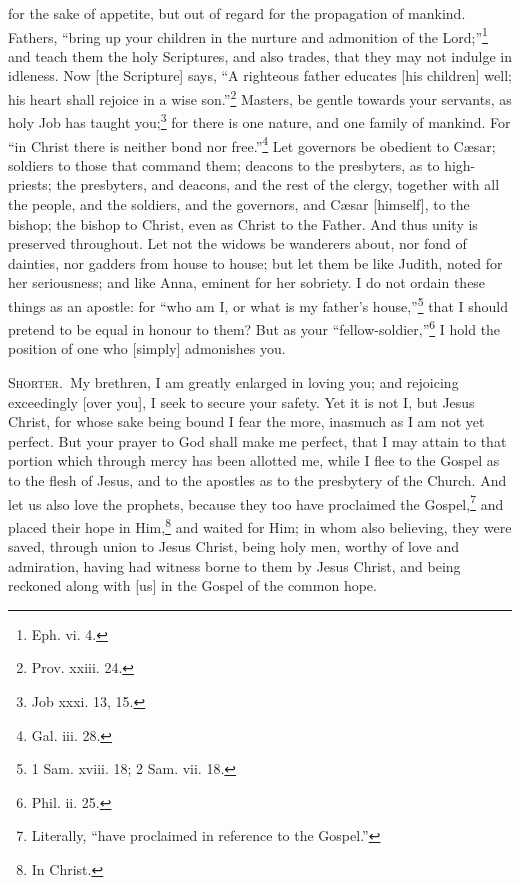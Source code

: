 for the sake of appetite, but out of regard for the propagation of mankind. Fathers, “bring up your children in the nurture and admonition of the Lord;”\footnote{Eph. vi. 4.} and teach them the holy Scriptures, and also trades, that they may not indulge in idleness. Now [the Scripture] says, “A righteous father educates [his children] well; his heart shall rejoice in a wise son.”\footnote{Prov. xxiii. 24.} Masters, be gentle towards your servants, as holy Job has taught you;\footnote{Job xxxi. 13, 15.} for there is one nature, and one family of mankind. For “in Christ there is neither bond nor free.”\footnote{Gal. iii. 28.} Let governors be obedient to Cæsar; soldiers to those that command them; deacons to the presbyters, as to high-priests; the presbyters, and deacons, and the rest of the clergy, together with all the people, and the soldiers, and the governors, and Cæsar [himself], to the bishop; the bishop to Christ, even as Christ to the Father. And thus unity is preserved throughout. Let not the widows be wanderers about, nor fond of dainties, nor gadders from house to house; but let them be like Judith, noted for her seriousness; and like Anna, eminent for her sobriety. I do not ordain these things as an apostle: for “who am I, or what is my father’s house,”\footnote{1 Sam. xviii. 18; 2 Sam. vii. 18.} that I should pretend to be equal in honour to them? But as your “fellow-soldier,”\footnote{Phil. ii. 25.} I hold the position of one who [simply] admonishes you.


\textsc{Shorter.}~My brethren, I am greatly enlarged in loving you; and rejoicing exceedingly [over you], I seek to secure your safety. Yet it is not I, but Jesus Christ, for whose sake being bound I fear the more, inasmuch as I am not yet perfect. But your prayer to God shall make me perfect, that I may attain to that portion which through mercy has been allotted me, while I flee to the Gospel as to the flesh of Jesus, and to the apostles as to the presbytery of the Church. And let us also love the prophets, because they too have proclaimed the Gospel,\footnote{Literally, “have proclaimed in reference to the Gospel.”} and placed their hope in Him,\footnote{In Christ.} and waited for Him; in whom also believing, they were saved, through union to Jesus Christ, being holy men, worthy of love and admiration, having had witness borne to them by Jesus Christ, and being reckoned along with [us] in the Gospel of the common hope.

